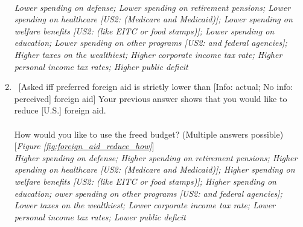 \begin{enumerate}[resume]
  \\ \textit{Lower spending on defense; Lower spending on retirement pensions; Lower spending on healthcare [US2: (Medicare and Medicaid)]; Lower spending on welfare benefits [US2: (like EITC or food stamps)]; Lower spending on education; Lower spending on other programs [US2: and federal agencies]; Higher taxes on the wealthiest; Higher corporate income tax rate; Higher personal income tax rates; Higher public deficit}
  \item \label{q:foreign_aid_reduce_how} ~[Asked iff preferred foreign aid is strictly lower than [Info: actual; No info: perceived] foreign aid] Your previous answer shows that you would like to reduce [U.S.] foreign aid.\\
\\
  How would you like to use the freed budget? (Multiple answers possible) [\textit{Figure \ref{fig:foreign_aid_reduce_how}}]
  \\ \textit{Higher spending on defense; Higher spending on retirement pensions; Higher spending on healthcare [US2: (Medicare and Medicaid)]; Higher spending on welfare benefits [US2: (like EITC or food stamps)]; Higher spending on education; ower spending on other programs [US2: and federal agencies]; Lower taxes on the wealthiest; Lower corporate income tax rate; Lower personal income tax rates; Lower public deficit}
\end{enumerate}


